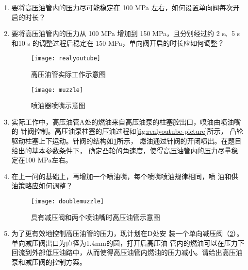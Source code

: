 \documentclass{cumcmthesis}
\begin{document}
\begin{enumerate}[label=\Roman*.]
	\item 要将高压油管内的压力尽可能稳定在 100 MPa 左右，如何设置单向阀每次开启的时长？\label{ques1} 
	\item 要将高压油管内的压力从 100 MPa 增加到 150 MPa，且分别经过约 2 s、5 s 和10 s 的调整过程后稳定在 150 MPa，单向阀开启的时长应如何调整？ \label{ques2} 
	\begin{figure}[!h]
		\centering %
		\begin{minipage}[b]{0.6\textwidth} %
			\centering %
			\texttt{[image: realyoutube]} %
			\caption{高压油管实际工作示意图}
			\label{fig:realyoutube-picture}
		\end{minipage}
		\begin{minipage}[b]{0.39\textwidth} %
			\centering %
			\texttt{[image: muzzle]}%
			\caption{喷油器喷嘴示意图 }
			\label{fig:muzzle-picture}
		\end{minipage}
	\end{figure}
	\item 实际工作中，高压油管A处的燃油来自高压油泵的柱塞腔出口，喷油由喷油嘴的
	针阀控制。高压油泵柱塞的压油过程如\cref{fig:realyoutube-picture}所示，
	凸轮驱动柱塞上下运动。针阀的结构如\cref{fig:muzzle-picture}所示，
	燃油通过针阀的开闭喷出。在题目给出的基本参数条件下，
	确定凸轮的角速度，使得高压油管内的压力尽量稳定在100 MPa左右。\label{ques3} 
	
	\item 在上一问的基础上，再增加一个喷油嘴，每个喷嘴喷油规律相同，喷
	油和供油策略应如何调整？\label{ques4} 
	\begin{figure}[!h]
			\centering %
			\texttt{[image: doublemuzzle]}
			\caption{具有减压阀和两个喷油嘴时高压油管示意图 }
			\label{fig:doublemuzzle-picture}
	\end{figure}

	\item 为了更有效地控制高压油管的压力，现计划在D处安
	装一个单向减压阀（\cref{fig:doublemuzzle-picture}）。单向减压阀出口为直径为1.4mm的圆，打开后高压油
	管内的燃油可以在压力下回流到外部低压油路中，从而使得高压油管内燃油的压力减小。请给出高压油泵和减压阀的控制方案。 \label{ques5} 
\end{enumerate}
\end{document}
